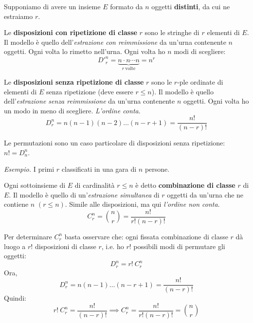 Supponiamo di avere un insieme $E$ formato da $n$ oggetti \textbf{distinti}, da cui ne estraiamo $r$.
\begin{definition}
Le \textbf{disposizioni con ripetizione di classe }$r$ sono le stringhe di $r$ elementi di $E$. Il modello è quello dell'\textit{estrazione con reimmissione} da un'urna contenente $n$ oggetti. Ogni volta lo rimetto nell'urna. Ogni volta ho $n$ modi di scegliere:
\begin{equation*}
\boxed{D'^{n}_{r} =\underbrace{n\cdot n\cdots n}_{r\ \text{volte}} =n^{r}}
\end{equation*}
\end{definition}
\begin{definition}
Le \textbf{disposizioni senza ripetizione di classe} $r$ sono le $r$-ple ordinate di elementi di $E$ senza ripetizione (deve essere $r\leq n$). Il modello è quello dell'\textit{estrazione senza reimmissione} da un'urna contenente $n$ oggetti. Ogni volta ho un modo in meno di scegliere. \textit{L'ordine conta}.
\begin{equation*}
\boxed{D_{r}^{n} =n( n-1)( n-2) \dots ( n-r+1) =\frac{n!}{( n-r) !}}
\end{equation*}
\end{definition}
\begin{oss}
Le permutazioni sono un caso particolare di disposizioni senza ripetizione: $n!=D_{n}^{n}$.
\end{oss}
\textit{Esempio.} I primi $r$ classificati in una gara di $n$ persone.

\begin{definition}
Ogni sottoinsieme di $E$ di cardinalità $r\leq n$ è detto \textbf{combinazione di classe} $r$ di $E$. Il modello è quello di un'\textit{estrazione simultanea} di $r$ oggetti da un'urna che ne contiene $n$ $( r\leq n)$. Simile alle disposizioni, ma qui \textit{l'ordine non conta}.
\begin{equation*}
\boxed{C_{r}^{n} =\binom{n}{r} =\frac{n!}{r!( n-r) !}}
\end{equation*}
\end{definition}
\begin{oss}
Per determinare $C_{r}^{n}$ basta osservare che: ogni fissata combinazione di classe $r$ dà luogo a $r!$ disposizioni di classe $r$, i.e. ho $r!$ possibili modi di permutare gli oggetti:
\begin{equation*}
D_{r}^{n} =r!\ C_{r}^{n}
\end{equation*}
Ora,
\begin{equation*}
D_{r}^{n} =n( n-1) \dots ( n-r+1) =\frac{n!}{( n-r) !}
\end{equation*}
Quindi:
\begin{equation*}
r!\ C_{r}^{n} =\frac{n!}{( n-r) !} \implies C_{r}^{n} =\frac{n!}{r!( n-r) !} =\binom{n}{r}
\end{equation*}
\end{oss}
\Esercizio{}

